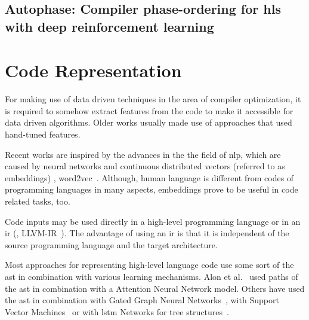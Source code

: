 \subsection*{Autophase: Compiler phase-ordering for hls with deep reinforcement learning}\cite{huang2019autophase}

\section{Code Representation}
For making use of data driven techniques in the area of compiler optimization, it is required to somehow extract features from the code to make it accessible for data driven algorithms.
Older works usually made use of approaches that used hand-tuned features.

Recent works are inspired by the advances in the the field of \ac{nlp}, which are caused by neural networks and continuous distributed vectors (referred to as embeddings) \eg, word2vec~\cite{mikolov2013efficient}. 
Although, human language is different from codes of programming languages in many aspects, embeddings prove to be useful in code related tasks, too.

Code inputs may be used directly in a high-level programming language or in an \ac{ir} (\eg, LLVM-IR~\cite{LLVM:CGO04}).
The advantage of using an \ac{ir} is that it is independent of the source programming language and the target architecture.


Most approaches for representing high-level language code use some sort of the \ac{ast} in combination with various learning mechanisms.
Alon et al.~\cite{alon2019code2vec} used paths of the \ac{ast} in combination with a Attention Neural Network model.
Others have used the \ac{ast} in combination with Gated Graph Neural Networks~\cite{ye2020deep, allamanis2017learning}, with Support Vector Machines~\cite{park2012using} or with \ac{lstm} Networks for tree structures~\cite{dam2018deep}.


